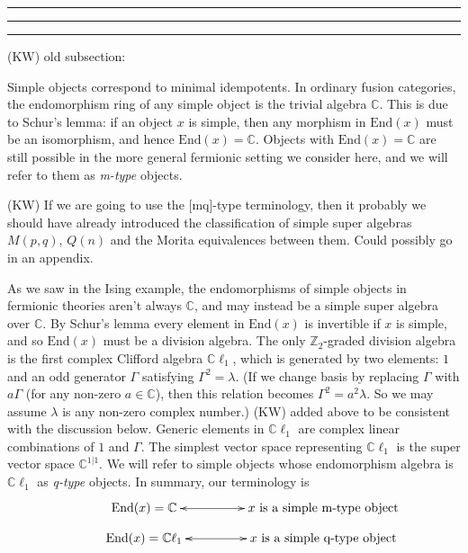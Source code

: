 \documentclass[12pt,a4paper]{article}
\newcommand{\zz}{\mathbb{Z}}
\newcommand{\cc}{\mathbb{C}}
\newcommand{\End}{\text{End}}
\newcommand{\cl}{\mathbb{C}\ell}
\newcommand{\ethan}[1]{{\color{amethyst}\footnotesize{(EL) #1}}}
\newcommand{\kw}[1]{{\color{kwcolor}\footnotesize{(KW) #1}}}
\newcommand{\kwsep}{\bigskip\hrule\medskip\hrule\medskip\hrule\bigskip}
\begin{document}
\kwsep

\kw{old subsection:}

\medskip


Simple objects correspond to minimal idempotents.
In ordinary fusion categories, the endomorphism ring of any simple object is the trivial algebra $\cc$. 
This is due to Schur's lemma: if an object $x$ is simple, then any morphism in $\End(x)$ 
must be an isomorphism, and hence $\End(x) = \cc$. 
Objects with $\End(x) = \cc$ are still possible in the more general fermionic setting we consider here, 
and we will refer to them as {\it m-type} objects.

\kw{If we are going to use the [mq]-type terminology, then it probably we should have already introduced
the classification of simple super algebras $M(p,q)$, $Q(n)$ and the Morita equivalences between them.
Could possibly go in an appendix.}

As we saw in the Ising example, the endomorphisms of simple objects in fermionic theories aren't always $\mathbb{C}$, and may instead be a simple super algebra over $\mathbb{C}$. 
By Schur's lemma every element in $\End(x)$ is invertible if $x$ is simple, and so $\End(x)$ must be a division algebra. 
The only $\zz_2$-graded division algebra is the first complex Clifford algebra $\cl_1$, 
which is generated by two elements: $1$ and an odd generator $\Gamma$ satisfying $\Gamma^2 = \lambda$. 
(If we change basis by replacing $\Gamma$ with $a \Gamma$ (for any non-zero $a\in \cc$), then this relation becomes
$\Gamma^2 = a^2\lambda$.
So we may assume $\lambda$ is any non-zero complex number.)
\kw{added above to be consistent with the discussion below.}
Generic elements in $\cl_1$ are complex linear combinations of $1$ and $\Gamma$.
The simplest vector space representing $\cl_1$ is the super vector space $\mathbb{C}^{1|1}$.
We will refer to simple objects whose endomorphism algebra is $\cl_1$ as {\it q-type} objects.
In summary, our terminology is 
\begin{align}
\vcenter{\xymatrix @!0 @M=1mm @C=25mm{
& \text{End}(x) = \mathbb{C} \ar@{<->}[rr] &   &\text{$x$ is a simple m-type object}&  \\
&\text{End}(x) = \mathbb{C} \ell_1 \ar@{<->}[rr]  &  &\text{$x$ is a simple q-type object}&
	}}
\end{align}
\end{document}
